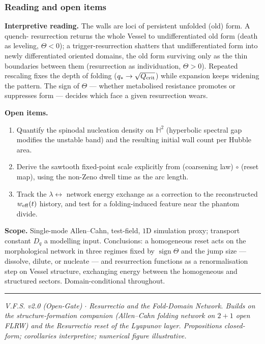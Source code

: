 \documentclass[11pt,a4paper]{article}
\newcommand{\Hh}{\mathbb{H}^2}
\newcommand{\Dq}{D_q}
\theoremstyle{plain}
\theoremstyle{definition}
\theoremstyle{remark}
\begin{document}
\subsubsection{Reading and open items}

\textbf{Interpretive reading.} The walls are loci of persistent unfolded (old) form. A quench-
resurrection returns the whole Vessel to undifferentiated old form (death as leveling,
$\Theta<0$); a trigger-resurrection shatters that undifferentiated form into newly differentiated
oriented domains, the old form surviving only as the thin boundaries between them (resurrection as
individuation, $\Theta>0$). Repeated rescaling fixes the depth of folding ($q_\ast\to\sqrt{Q_{\rm crit}}$)
while expansion keeps widening the pattern. The sign of $\Theta$ --- whether metabolised resistance
promotes or suppresses form --- decides which face a given resurrection wears.

\textbf{Open items.}
\begin{enumerate}[leftmargin=1.6em,itemsep=2pt]
\item Quantify the spinodal nucleation density on $\Hh$ (hyperbolic spectral gap modifies the unstable
band) and the resulting initial wall count per Hubble area.
\item Derive the sawtooth fixed-point scale explicitly from (coarsening law)$\,\circ\,$(reset map), using
the non-Zeno dwell time as the arc length.
\item Track the $\lambda\leftrightarrow$ network energy exchange as a correction to the reconstructed
$w_{\rm eff}(t)$ history, and test for a folding-induced feature near the phantom divide.
\end{enumerate}

\textbf{Scope.} Single-mode Allen--Cahn, test-field, $1$D simulation proxy; transport constant $\Dq$ a
modelling input. Conclusions: a homogeneous reset acts on the morphological network in three regimes
fixed by $\operatorname{sign}\Theta$ and the jump size --- dissolve, dilute, or nucleate --- and
resurrection functions as a renormalisation step on Vessel structure, exchanging energy between the
homogeneous and structured sectors. Domain-conditional throughout.

\vspace{0.5em}
\hrule
\smallskip
\noindent\footnotesize\emph{V.F.S. v2.0 (Open-Gate) $\cdot$ Resurrectio and the Fold-Domain Network.
Builds on the structure-formation companion (Allen--Cahn folding network on $2{+}1$ open FLRW) and the
Resurrectio reset of the Lyapunov layer. Propositions closed-form; corollaries interpretive; numerical
figure illustrative.}
\newpage
\end{document}
